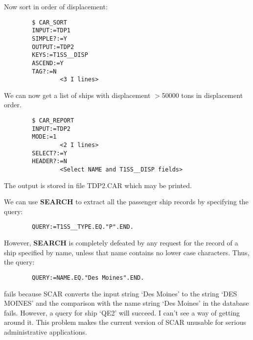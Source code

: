 Now sort in order of displacement:
\begin{verbatim}
        $ CAR_SORT
        INPUT:=TDP1
        SIMPLE?:=Y
        OUTPUT:=TDP2
        KEYS:=T1SS__DISP
        ASCEND:=Y
        TAG?:=N
                <3 I lines>
\end{verbatim}
We can now get a list of ships with displacement $>$50000 tons in displacement
order.
\begin{verbatim}
        $ CAR_REPORT
        INPUT:=TDP2
        MODE:=1
                <2 I lines>
        SELECT?:=Y
        HEADER?:=N
                <Select NAME and T1SS__DISP fields>
\end{verbatim}
The output is stored in file TDP2.CAR which may be printed.

We can use {\bf SEARCH} to extract all the passenger ship records by
specifying the query:
\begin{verbatim}
        QUERY:=T1SS__TYPE.EQ."P".END.
\end{verbatim}
However, {\bf SEARCH} is completely defeated by any request for the record
of a ship specified by name, unless that name contains no lower case characters.
Thus, the query:
\begin{verbatim}
        QUERY:=NAME.EQ."Des Moines".END.
\end{verbatim}
fails because SCAR converts the input string `Des Moines' to the string
`DES MOINES' and the comparison with the name string `Des Moines' in the
database fails.
However, a query for ship `QE2' will succeed.
I can't see a way of getting around it.
This problem makes the current version of SCAR unusable for serious
administrative applications.

